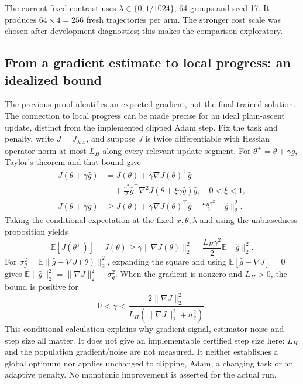 \documentclass[11pt]{article}
\newcommand{\E}{\mathbb{E}}
\begin{document}
The current fixed contrast uses $\lambda\in\{0,1/1024\}$, 64 groups and seed 17. It produces $64\times4=256$ fresh trajectories per arm. The stronger cost scale was chosen after development diagnostics; this makes the comparison exploratory.

\subsection{From a gradient estimate to local progress: an idealized bound}

The previous proof identifies an expected gradient, not the final trained solution. The connection to local progress can be made precise for an ideal plain-ascent update, distinct from the implemented clipped Adam step. Fix the task and penalty, write $J=J_{\lambda,x}$, and suppose $J$ is twice differentiable with Hessian operator norm at most $L_H$ along every relevant update segment. For $\theta^+=\theta+\gamma\widehat g$, Taylor's theorem and that bound give
\begin{align}
 J(\theta+\gamma\widehat g)
 &=J(\theta)+\gamma\nabla J(\theta)^\top\widehat g\nonumber\\
 &\quad+\frac{\gamma^2}{2}\widehat g^\top
       \nabla^2J(\theta+\xi\gamma\widehat g)\widehat g,
       \quad 0<\xi<1,\\
 J(\theta+\gamma\widehat g)
 &\geq J(\theta)+\gamma\nabla J(\theta)^\top\widehat g
                  -\frac{L_H\gamma^2}{2}\|\widehat g\|_2^2.
\end{align}
Taking the conditional expectation at the fixed $x,\theta,\lambda$ and using the unbiasedness proposition yields
\begin{equation}
 \E[J(\theta^+)]-J(\theta)
 \geq\gamma\|\nabla J(\theta)\|_2^2
            -\frac{L_H\gamma^2}{2}\E\|\widehat g\|_2^2.
\end{equation}
For $\sigma_g^2=\E\|\widehat g-\nabla J(\theta)\|_2^2$, expanding the square and using $\E[\widehat g-\nabla J]=0$ gives $\E\|\widehat g\|_2^2=\|\nabla J\|_2^2+\sigma_g^2$. When the gradient is nonzero and $L_H>0$, the bound is positive for
\begin{equation}
 0<\gamma<\frac{2\|\nabla J\|_2^2}
                   {L_H(\|\nabla J\|_2^2+\sigma_g^2)}.
\end{equation}
This conditional calculation explains why gradient signal, estimator noise and step size all matter. It does not give an implementable certified step size here: $L_H$ and the population gradient/noise are not measured. It neither establishes a global optimum nor applies unchanged to clipping, Adam, a changing task or an adaptive penalty. No monotonic improvement is asserted for the actual run.
\end{document}
